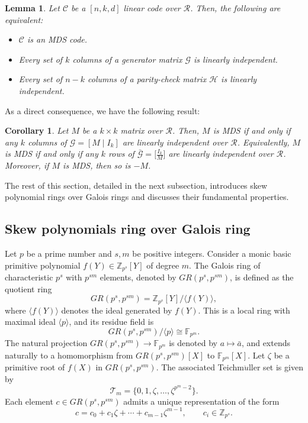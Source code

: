 \documentclass[11pt]{article}
\newtheorem{corollary}{Corollary}
\newtheorem{lemma}{Lemma}
\begin{document}
\begin{lemma}\cite{MacWilliams1977the}\label{lem3}
Let $\mathcal{C}$ be a $[n,k,d]$ linear code over $\mathcal{R}$. Then, the following are equivalent: 
\begin{itemize}
    \item[\textnormal{(i)}] $\mathcal{C}$ is an MDS code.
    \item[\textnormal{(ii)}] Every set of $k$ columns of a generator matrix $\mathcal{G}$ is linearly independent.
    \item[\textnormal{(iii)}] Every set of $n-k$ columns of a parity-check matrix $\mathcal{H}$ is linearly independent.
\end{itemize}
\end{lemma}

As a direct consequence, we have the following result:

\begin{corollary}\cite[Corollary, p.319]{MacWilliams1977the}\label{Fact1}
Let $M$ be a $k \times k$ matrix over $\mathcal{R}$. Then, $M$ is MDS if and only if any $k$ columns 
of 
\(
\mathcal{G} = [M \mid I_k]
\)
are linearly independent over $\mathcal{R}$. Equivalently, $M$ is MDS if and only if any $k$ rows of
\(
\bar{\mathcal{G}} =\Big[ \frac{I_k}{M}\Big]
\)
are linearly independent over $\mathcal{R}$. Moreover, if $M$ is MDS, then so is $-M$. 
\end{corollary}
The rest of this section, detailed in the next subsection, introduces skew polynomial rings over Galois rings and discusses their fundamental properties.

\subsection{Skew polynomials ring over Galois ring}\label{Sec:skew-poly-pre}

Let $p$ be a prime number and  $s, m$ be positive integers. Consider a monic basic primitive polynomial $f(Y) \in \mathbb{Z}_{p^s}[Y]$ of degree $m$. The Galois ring of characteristic $p^s$ with $p^{sm}$ elements, denoted by $GR(p^s, p^{sm})$, is defined as the quotient ring
\[
GR(p^s, p^{sm}) = \mathbb{Z}_{p^s}[Y]/\langle f(Y) \rangle,
\]
where $\langle f(Y) \rangle$ denotes the ideal generated by $f(Y)$. This is a local ring with maximal ideal $\langle p \rangle$, and its residue field is
\[
GR(p^s, p^{sm}) / \langle p \rangle \cong \mathbb{F}_{p^m}.
\]
The natural projection $GR(p^s, p^{sm}) \to \mathbb{F}_{p^m}$ is denoted by $a \mapsto \bar{a}$, and extends naturally to a homomorphism from $GR(p^s, p^{sm})[X]$ to $\mathbb{F}_{p^m}[X]$. Let $\zeta$ be a primitive root of $f(X)$ in $GR(p^s, p^{sm})$. The associated Teichm$\ddot{u}$ller set is given by
\[
\mathcal{T}_m = \{0, 1, \zeta, \dots, \zeta^{p^m-2}\}.
\]
Each element $c \in GR(p^s, p^{sm})$ admits a unique representation of the form
\[
c = c_0 + c_1 \zeta + \cdots + c_{m-1} \zeta^{m-1}, \qquad c_i \in \mathbb{Z}_{p^s}.
\]
\end{document}
